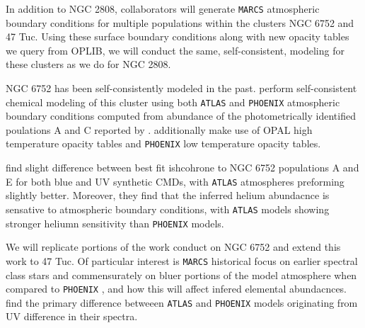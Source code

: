 In addition to NGC 2808, collaborators will generate \texttt{MARCS} atmospheric
boundary conditions for multiple populations within the clusters NGC 6752 and
47 Tuc. Using these surface boundary conditions along with new opacity tables
we query from OPLIB, we will conduct the same, self-consistent, modeling for
these clusters as we do for NGC 2808.

NGC 6752 has been self-consistently modeled in the past. \citet{Dotter2015} perform
self-consistent chemical modeling of this cluster using both \texttt{ATLAS} and
\texttt{PHOENIX} atmospheric boundary conditions computed from abundance of the
photometrically identified poulations A and C reported by \citet{Milone2013}.
\citeauthor{Dotter2015} additionally make use of OPAL high temperature opacity
tables and \texttt{PHOENIX} low temperature opacity tables.  

\citeauthor{Dotter2015} find slight difference between best fit ishcohrone to
NGC 6752 populations A and E for both blue and UV synthetic CMDs, with
\texttt{ATLAS} atmospheres preforming slightly better. Moreover, they find that
the inferred helium abundacnce is sensative to atmospheric boundary conditions,
with \texttt{ATLAS} models showing stronger heliumn sensitivity than
\texttt{PHOENIX} models.

We will replicate portions of the work \citeauthor{Dotter2015} conduct on NGC
6752 and extend this work to 47 Tuc. Of particular interest is \texttt{MARCS}
historical focus on earlier spectral class stars and commensurately on bluer
portions of the model atmosphere when compared to \texttt{PHOENIX}
\citep{Plez2011}, and how this will affect infered elemental abundacnces.
\citeauthor{Dotter2015} find the primary difference betweeen \texttt{ATLAS} and
\texttt{PHOENIX} models originating from UV difference in their spectra.
